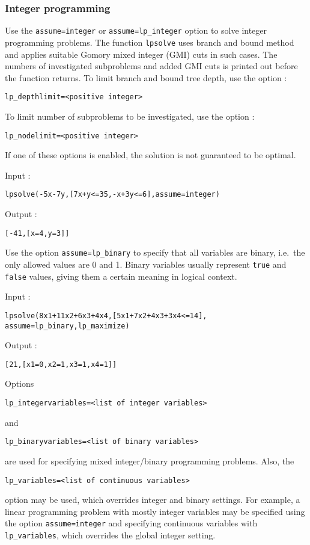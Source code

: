 \documentclass[a4paper,11pt]{book}
\begin{document}
\subsubsection{Integer programming}
Use the {\tt assume=integer} or {\tt assume=lp\_integer} option to solve integer programming problems. The function {\tt lpsolve} uses branch and bound method and applies suitable Gomory mixed integer (GMI) cuts in such cases. The numbers of investigated subproblems and added GMI cuts is printed out before the function returns. To limit branch and bound tree depth, use the option : \begin{center}
{\tt lp\_depthlimit=<positive integer>}
\end{center}
To limit number of subproblems to be investigated, use the option :
\begin{center}
{\tt lp\_nodelimit=<positive integer>}
\end{center}
If one of these options is enabled, the solution is not guaranteed to be optimal.

\noindent Input :
\begin{center}
{\tt lpsolve(-5x-7y,[7x+y<=35,-x+3y<=6],assume=integer)}
\end{center}
Output :
\begin{center}
{\tt [-41,[x=4,y=3]]}
\end{center}

Use the option {\tt assume=lp\_binary} to specify that all variables are binary, i.e.~the only allowed values are 0 and 1. Binary variables usually represent {\tt true}  and {\tt false} values, giving them a certain meaning in logical context.

\noindent Input :
\begin{center}
{\tt lpsolve(8x1+11x2+6x3+4x4,[5x1+7x2+4x3+3x4<=14],}\\
{\tt assume=lp\_binary,lp\_maximize)}
\end{center}
Output :
\begin{center}
{\tt [21,[x1=0,x2=1,x3=1,x4=1]]}
\end{center}

Options \begin{center}
{\tt lp\_integervariables=<list of integer variables>}
\end{center} and \begin{center}
{\tt lp\_binaryvariables=<list of binary variables>}
\end{center} are used for specifying mixed integer/binary programming problems. Also, the \begin{center}
{\tt lp\_variables=<list of continuous variables>}
\end{center} option may be used, which overrides integer and binary settings. For example, a linear programming problem with mostly integer variables may be specified using the option {\tt assume=integer} and specifying continuous variables with {\tt lp\_variables}, which overrides the global integer setting.
\end{document}
